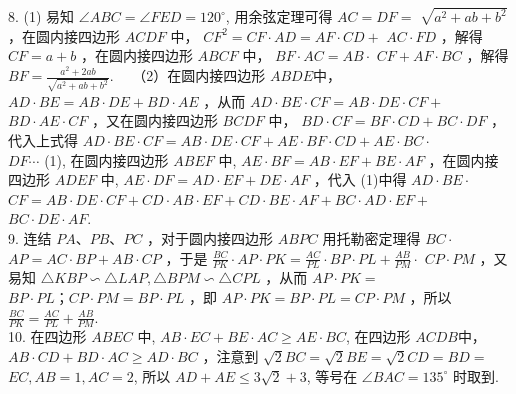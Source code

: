 \documentclass[10pt]{article}
\begin{document}
8. (1) 易知 $\angle A B C=\angle F E D=120^{\circ}$, 用余弦定理可得 $A C=D F=$ $\sqrt{a^{2}+a b+b^{2}}$ ，在圆内接四边形 $A C D F$ 中， $C F^{2}=C F \cdot A D=A F \cdot C D+$ $A C \cdot F D$ ，解得 $C F=a+b$ ，在圆内接四边形 $A B C F$ 中， $B F \cdot A C=A B \cdot$ $C F+A F \cdot B C$ ，解得 $B F=\frac{a^{2}+2 a b}{\sqrt{a^{2}+a b+b^{2}}} . \quad$ （2）在圆内接四边形 $A B D E$中， $A D \cdot B E=A B \cdot D E+B D \cdot A E$ ，从而 $A D \cdot B E \cdot C F=A B \cdot D E \cdot C F+$ $B D \cdot A E \cdot C F$ ，又在圆内接四边形 $B C D F$ 中， $B D \cdot C F=B F \cdot C D+B C \cdot D F$ ，代入上式得 $A D \cdot B E \cdot C F=A B \cdot D E \cdot C F+A E \cdot B F \cdot C D+A E \cdot B C \cdot$\\
$D F \cdots$ (1), 在圆内接四边形 $A B E F$ 中, $A E \cdot B F=A B \cdot E F+B E \cdot A F$ ，在圆内接四边形 $A D E F$ 中, $A E \cdot D F=A D \cdot E F+D E \cdot A F$ ，代入 (1)中得 $A D \cdot B E \cdot$ $C F=A B \cdot D E \cdot C F+C D \cdot A B \cdot E F+C D \cdot B E \cdot A F+B C \cdot A D \cdot E F+$ $B C \cdot D E \cdot A F$.\\
9. 连结 $P A 、 P B 、 P C$ ，对于圆内接四边形 $A B P C$ 用托勒密定理得 $B C \cdot$ $A P=A C \cdot B P+A B \cdot C P$ ，于是 $\frac{B C}{P K} \cdot A P \cdot P K=\frac{A C}{P L} \cdot B P \cdot P L+\frac{A B}{P M} \cdot$ $C P \cdot P M$ ，又易知 $\triangle K B P \backsim \triangle L A P, \triangle B P M \backsim \triangle C P L$ ，从而 $A P \cdot P K=$ $B P \cdot P L ； C P \cdot P M=B P \cdot P L$ ，即 $A P \cdot P K=B P \cdot P L=C P \cdot P M$ ，所以 $\frac{B C}{P K}=\frac{A C}{P L}+\frac{A B}{P M}$.\\
10. 在四边形 $A B E C$ 中, $A B \cdot E C+B E \cdot A C \geqslant A E \cdot B C$, 在四边形 $A C D B$中， $A B \cdot C D+B D \cdot A C \geqslant A D \cdot B C$ ，注意到 $\sqrt{2} B C=\sqrt{2} B E=\sqrt{2} C D=B D=$ $E C, A B=1, A C=2$, 所以 $A D+A E \leqslant 3 \sqrt{2}+3$, 等号在 $\angle B A C=135^{\circ}$ 时取到.
\end{document}
